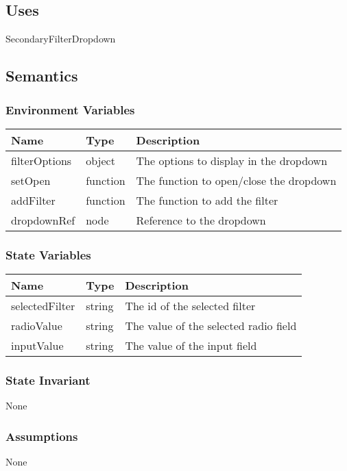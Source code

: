 \documentclass[12pt]{article}
\begin{document}
\subsection{Uses}
SecondaryFilterDropdown

\subsection{Semantics}

\subsubsection{Environment Variables}
\begin{tabular}{| l | l | p{10cm} |}
    \hline
    \textbf{Name} & \textbf{Type} & \textbf{Description}\\ \hline
    filterOptions & object & The options to display in the dropdown\\ \hline
    setOpen & function & The function to open/close the dropdown\\ \hline
    addFilter & function & The function to add the filter\\ \hline
    dropdownRef & node & Reference to the dropdown\\ \hline
\end{tabular}

\subsubsection{State Variables}
\begin{tabular}{| l | l | p{10cm} |}
    \hline
    \textbf{Name} & \textbf{Type} & \textbf{Description}\\ \hline
    selectedFilter & string & The id of the selected filter\\ \hline
    radioValue & string & The value of the selected radio field\\ \hline
    inputValue & string & The value of the input field\\ \hline
\end{tabular}

\subsubsection{State Invariant}
None

\subsubsection{Assumptions}
None
\end{document}
